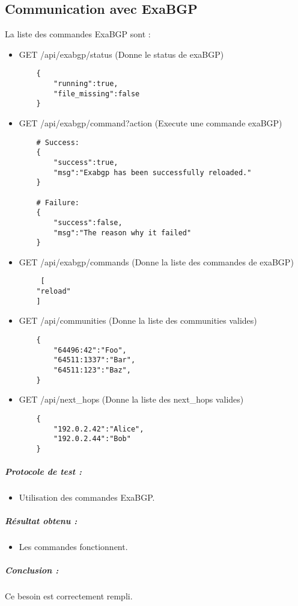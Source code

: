 \subsection{Communication avec ExaBGP}
\label{sssec:exabgp}
\noindent
La liste des commandes ExaBGP sont :
\begin{itemize}
    \item GET /api/exabgp/status (Donne le status de exaBGP)
    \begin{verbatim}
    {
        "running":true,
        "file_missing":false
    }
    \end{verbatim}

    \item GET /api/exabgp/command{?action} (Execute une commande exaBGP)
    \begin{verbatim}
    # Success:
    {
        "success":true,
        "msg":"Exabgp has been successfully reloaded."
    }

    # Failure:
    {
        "success":false,
        "msg":"The reason why it failed"
    }
    \end{verbatim}

    \item GET /api/exabgp/commands (Donne la liste des commandes de exaBGP)
    \begin{verbatim}
     [
    "reload"
    ]
    \end{verbatim}

    \item GET /api/communities (Donne la liste des communities valides)
    \begin{verbatim}
    {
        "64496:42":"Foo",
        "64511:1337":"Bar",
        "64511:123":"Baz",
    }
    \end{verbatim}

    \item GET /api/next\_hops (Donne la liste des next\_hops valides)
    \begin{verbatim}
    {
        "192.0.2.42":"Alice",
        "192.0.2.44":"Bob"
    }
    \end{verbatim}

\end{itemize}

\subparagraph{Protocole de test :}
\begin{itemize}
    \item Utilisation des commandes ExaBGP.
\end{itemize}
\subparagraph{Résultat obtenu :}
    \begin{itemize}
    \item Les commandes fonctionnent.
\end{itemize}
\subparagraph{Conclusion :}Ce besoin est correctement rempli.


